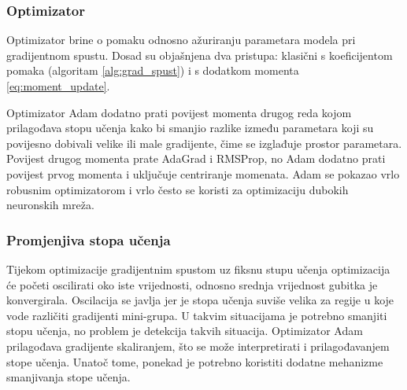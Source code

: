 \documentclass[times, utf8, numeric, diplomski]{fer}
\def\TODO#1{\noindent\textcolor{red}{TODO: \textit{#1}}\newline}
\def\todo#1{\TODO{#1}}
\begin{document}
\subsubsection{Optimizator}
Optimizator brine o pomaku odnosno ažuriranju parametara modela pri gradijentnom spustu. Dosad su objašnjena dva pristupa: klasični s koeficijentom pomaka (algoritam \ref{alg:grad_spust}) i s dodatkom momenta \eqref{eq:moment_update}.

Optimizator Adam  dodatno prati povijest momenta drugog reda kojom prilagođava stopu učenja kako bi smanjio razlike između parametara koji su povijesno dobivali velike ili male gradijente, čime se izglađuje prostor parametara. Povijest drugog momenta prate AdaGrad i RMSProp, no Adam dodatno prati povijest prvog momenta i uključuje centriranje momenata. Adam se pokazao vrlo robusnim optimizatorom i vrlo često se koristi za optimizaciju dubokih neuronskih mreža. \citep[poglavlje~8.5]{goodfellowbook}

\subsubsection{Promjenjiva stopa učenja}
Tijekom optimizacije gradijentnim spustom uz fiksnu stupu učenja optimizacija će početi oscilirati oko iste vrijednosti, odnosno srednja vrijednost gubitka je konvergirala. Oscilacija se javlja jer je stopa učenja suviše velika za regije u koje vode različiti gradijenti mini-grupa. U takvim situacijama je potrebno smanjiti stopu učenja, no problem je detekcija takvih situacija. Optimizator Adam prilagođava gradijente skaliranjem, što se može interpretirati i prilagođavanjem stope učenja. Unatoč tome, ponekad je potrebno koristiti dodatne mehanizme smanjivanja stope učenja.


\end{document}
